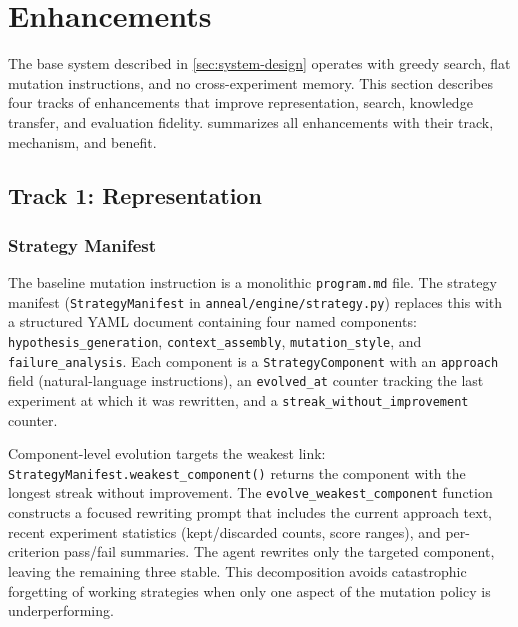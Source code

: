 \section{Enhancements}\label{sec:enhancements}

The base system described in \cref{sec:system-design} operates with greedy search, flat mutation instructions, and no cross-experiment memory.
This section describes four tracks of enhancements that improve representation, search, knowledge transfer, and evaluation fidelity.
 summarizes all enhancements with their track, mechanism, and benefit.

\subsection{Track 1: Representation}\label{sec:track-representation}

\subsubsection{Strategy Manifest}\label{sec:strategy-manifest}

The baseline mutation instruction is a monolithic \texttt{program.md} file.
The strategy manifest (\texttt{Strategy\allowbreak{}Manifest} in \texttt{anneal/\allowbreak{}engine/\allowbreak{}strategy.py}) replaces this with a structured YAML document containing four named components: \texttt{hypothesis\allowbreak{}\_generation}, \texttt{context\allowbreak{}\_assembly}, \texttt{mutation\allowbreak{}\_style}, and \texttt{failure\allowbreak{}\_analysis}.
Each component is a \texttt{Strategy\allowbreak{}Component} with an \texttt{approach} field (natural-language instructions), an \texttt{evolved\allowbreak{}\_at} counter tracking the last experiment at which it was rewritten, and a \texttt{streak\allowbreak{}\_without\allowbreak{}\_improvement} counter.

Component-level evolution targets the weakest link: \texttt{Strategy\allowbreak{}Manifest.\allowbreak{}weakest\allowbreak{}\_component()} returns the component with the longest streak without improvement.
The \texttt{evolve\allowbreak{}\_weakest\allowbreak{}\_component} function constructs a focused rewriting prompt that includes the current approach text, recent experiment statistics (kept/discarded counts, score ranges), and per-criterion pass/fail summaries.
The agent rewrites only the targeted component, leaving the remaining three stable.
This decomposition avoids catastrophic forgetting of working strategies when only one aspect of the mutation policy is underperforming.

